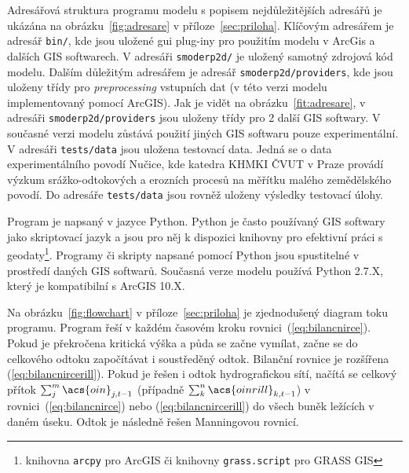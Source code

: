 Adresářová struktura programu modelu \smod s popisem nejdůležitějších adresářů 
je ukázána na obrázku~\ref{fig:adresare} v příloze~\ref{sec:priloha}. 
Klíčovým adresářem je adresář {\tt bin/}, kde jsou uložené gui plug-iny pro použitím modelu v ArcGis
a dalších GIS softwarech. V adresáři {\tt smoderp2d/} je uložený samotný zdrojová kód modelu. 
Dalším důležitým adresářem je adresář {\tt smoderp2d/providers}, kde jsou uloženy třídy  
pro {\it preprocessing} vstupních dat (v této verzi modelu implementovaný pomocí ArcGIS). 
Jak je vidět na obrázku~\ref{fit:adresare}, v adresáři {\tt smoderp2d/providers} jsou uloženy
třídy pro 2 další GIS softwary. V současné verzi modelu zůstává použití jiných GIS softwaru pouze experimentální. 
V adresáři {\tt tests/data} jsou uložena testovací data. Jedná se o data experimentálního
povodí Nučice, kde katedra KHMKI ČVUT v Praze provádí výzkum srážko-odtokových a erozních procesů
na měřítku malého zemědělského povodí. Do adresáře {\tt tests/data} jsou rovněž
uloženy výsledky testovací úlohy. 


Program \smod je napsaný v jazyce Python. Python je často používaný GIS softwary jako skriptovací jazyk a jsou pro něj k dispozici knihovny pro efektivní práci s geodaty\footnote{knihovna {\tt arcpy} pro ArcGIS či knihovny {\tt grass.script} pro GRASS GIS}. Programy či skripty napsané pomocí Python jsou spustitelné v prostředí daných GIS softwarů. Současná verze modelu \smod používá Python 2.7.X, který je kompatibilní s ArcGIS 10.X.

Na obrázku~\ref{fig:flowchart} v příloze~\ref{sec:priloha} je zjednodušený diagram toku programu. Program řeší v každém časovém kroku rovnici~(\ref{eq:bilancnirce}). Pokud je překročena kritická výška a půda se začne vymílat, začne se do celkového  odtoku  započítávat i soustředěný odtok. Bilanční rovnice je rozšířena (\ref{eq:bilancnircerill}). Pokud je řešen i odtok hydrografickou sítí, načítá se celkový přítok $\sum_j^m \acs{oin}_{j,t-1}$ (případně $\sum_k^n \acs{oinrill}_{k,t-1}$) v rovnici~(\ref{eq:bilancnirce})  nebo (\ref{eq:bilancnircerill}) do všech buněk ležících v daném úseku. Odtok je následně řešen Manningovou rovnicí.

